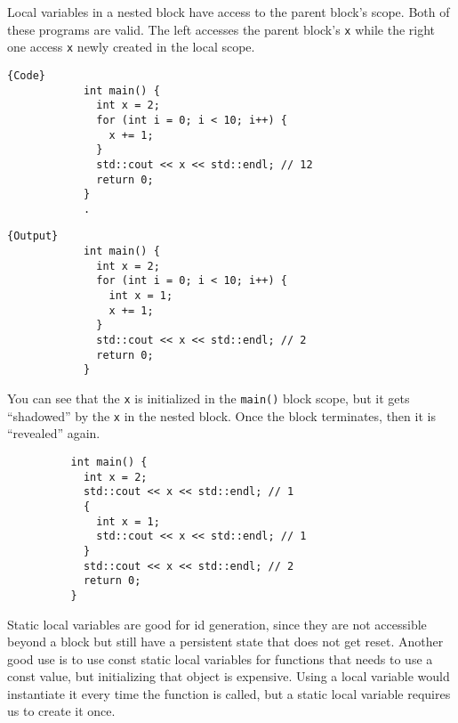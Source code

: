 \documentclass{article}
\begin{document}
      \begin{example}
        Local variables in a nested block have access to the parent block's scope. Both of these programs are valid. The left accesses the parent block's \texttt{x} while the right one access \texttt{x} newly created in the local scope. 

        \noindent\begin{minipage}{.5\textwidth}
          \begin{lstlisting}[]{Code}
            int main() {  
              int x = 2; 
              for (int i = 0; i < 10; i++) {
                x += 1;
              }
              std::cout << x << std::endl; // 12
              return 0; 
            }
            .
          \end{lstlisting}
          \end{minipage}
          \hfill
          \begin{minipage}{.49\textwidth}
          \begin{lstlisting}[]{Output}
            int main() {  
              int x = 2; 
              for (int i = 0; i < 10; i++) {
                int x = 1;
                x += 1;
              }
              std::cout << x << std::endl; // 2
              return 0; 
            }
          \end{lstlisting}
        \end{minipage}
      \end{example}

      \begin{example}
        You can see that the \texttt{x} is initialized in the \texttt{main()} block scope, but it gets ``shadowed'' by the \texttt{x} in the nested block. Once the block terminates, then it is ``revealed'' again. 

        \begin{lstlisting}
          int main() {  
            int x = 2; 
            std::cout << x << std::endl; // 1
            {
              int x = 1;
              std::cout << x << std::endl; // 1
            }
            std::cout << x << std::endl; // 2 
            return 0; 
          }
        \end{lstlisting}
      \end{example} 

      Static local variables are good for id generation, since they are not accessible beyond a block but still have a persistent state that does not get reset. Another good use is to use const static local variables for functions that needs to use a const value, but initializing that object is expensive. Using a local variable would instantiate it every time the function is called, but a static local variable requires us to create it once. 
\end{document}
